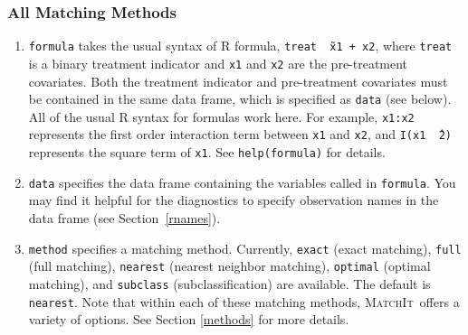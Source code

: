 \documentclass[oneside,letterpaper,titlepage]{article}
\newcommand{\MatchIt}{\textsc{MatchIt}}
\begin{document}
\subsubsection{All Matching Methods}
\label{subsubsec:inputs-all}

\begin{enumerate}
  
\item \texttt{formula} takes the usual syntax of R formula, {\tt treat
    \~\ x1 + x2}, where {\tt treat} is a binary treatment indicator
  and {\tt x1} and {\tt x2} are the pre-treatment covariates. Both the
  treatment indicator and pre-treatment covariates must be contained
  in the same data frame, which is specified as {\tt data} (see
  below).  All of the usual R syntax for formulas work here. For
  example, {\tt x1:x2} represents the first order interaction term
  between {\tt x1} and {\tt x2}, and {\tt I(x1 \^\ 2)} represents the
  square term of {\tt x1}. See {\tt help(formula)} for details.
  
\item \texttt{data} specifies the data frame containing the variables
  called in {\tt formula}.  You may find it helpful for the
  diagnostics to specify observation names in the data frame (see
  Section~\ref{rnames}).
  
\item \texttt{method} specifies a matching method. Currently,
  \texttt{exact} (exact matching), \texttt{full} (full matching),
  \texttt{nearest} (nearest neighbor matching), \texttt{optimal}
  (optimal matching), and \texttt{subclass} (subclassification) are
  available. The default is \texttt{nearest}. Note that within each of
  these matching methods, \MatchIt\ offers a variety of options.  See
  Section \ref{methods} for more details.
  

\end{enumerate}
\end{document}
